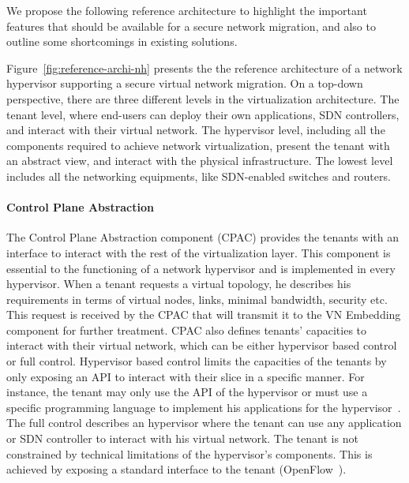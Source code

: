 We propose the following reference architecture to highlight the important features that should be available for a secure network migration, and also to outline some shortcomings in existing solutions.


  
Figure~\ref{fig:reference-archi-nh} presents the the reference architecture of a network hypervisor supporting a secure virtual network migration.
On a top-down perspective, there are three different levels in the virtualization architecture.
The tenant level, where end-users can deploy their own applications, SDN controllers, and interact with their virtual network.
The hypervisor level, including all the components required to achieve network virtualization, present the tenant with an abstract view, and interact with the physical infrastructure.
The lowest level includes all the networking equipments, like SDN-enabled switches and routers.

\paragraph{Control Plane Abstraction}
The Control Plane Abstraction component (CPAC) provides the tenants with an interface to interact with the rest of the virtualization layer.
This component is essential to the functioning of a network hypervisor and is implemented in every hypervisor.
When a tenant requests a virtual topology, he describes his requirements in terms of virtual nodes, links, minimal bandwidth, security etc. This request is received by the CPAC that will transmit it to the VN Embedding component for further treatment.
CPAC also defines tenants' capacities to interact with their virtual network, which can be either hypervisor based control or full control.
Hypervisor based control limits the capacities of the tenants by only exposing an API to interact with their slice in a specific manner. For instance, the tenant may only use the API of the hypervisor or must use a specific programming language to implement his applications for the hypervisor~\cite{FlowN-Drutskoy2012,NetworkHypervisor-Huang2013}. 
The full control describes an hypervisor where the tenant can use any application or SDN controller to interact with his virtual network. The tenant is not constrained by technical limitations of the hypervisor's components.
This is achieved by exposing a standard interface to the tenant (\eg OpenFlow~\cite{Openflow-McKeown2008}).


